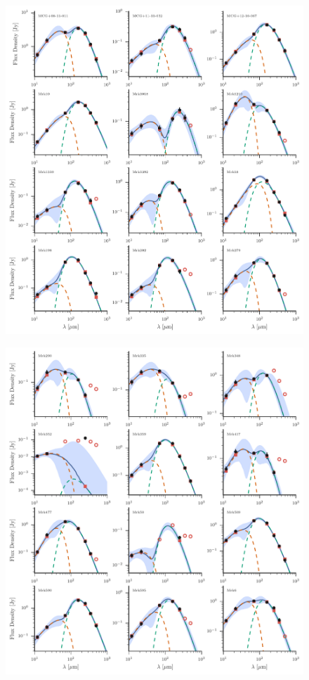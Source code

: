 \begin{figure}
\centering
\includegraphics[width=\textwidth]{figures/sedfig16}
\caption{}
\end{figure}

\begin{figure}
\centering
\includegraphics[width=\textwidth]{figures/sedfig17}
\caption{}
\end{figure}

